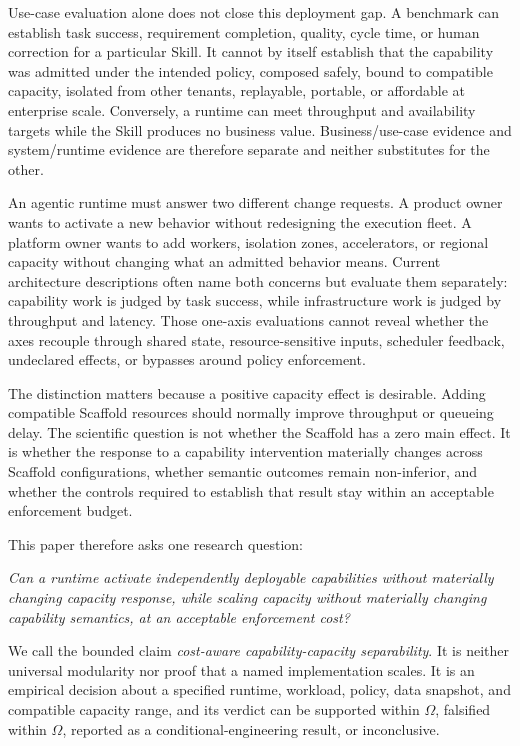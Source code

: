 Use-case evaluation alone does not close this deployment gap. A benchmark can establish task success, requirement completion, quality, cycle time, or human correction for a particular Skill. It cannot by itself establish that the capability was admitted under the intended policy, composed safely, bound to compatible capacity, isolated from other tenants, replayable, portable, or affordable at enterprise scale. Conversely, a runtime can meet throughput and availability targets while the Skill produces no business value. Business/use-case evidence and system/runtime evidence are therefore separate and neither substitutes for the other.

An agentic runtime must answer two different change requests. A product owner wants to activate a new behavior without redesigning the execution fleet. A platform owner wants to add workers, isolation zones, accelerators, or regional capacity without changing what an admitted behavior means. Current architecture descriptions often name both concerns but evaluate them separately: capability work is judged by task success, while infrastructure work is judged by throughput and latency. Those one-axis evaluations cannot reveal whether the axes recouple through shared state, resource-sensitive inputs, scheduler feedback, undeclared effects, or bypasses around policy enforcement.

The distinction matters because a positive capacity effect is desirable. Adding compatible Scaffold resources should normally improve throughput or queueing delay. The scientific question is not whether the Scaffold has a zero main effect. It is whether the response to a capability intervention materially changes across Scaffold configurations, whether semantic outcomes remain non-inferior, and whether the controls required to establish that result stay within an acceptable enforcement budget.

This paper therefore asks one research question:

\textit{Can a runtime activate independently deployable capabilities without materially changing capacity response, while scaling capacity without materially changing capability semantics, at an acceptable enforcement cost?}

We call the bounded claim \textit{cost-aware capability-capacity separability}. It is neither universal modularity nor proof that a named implementation scales. It is an empirical decision about a specified runtime, workload, policy, data snapshot, and compatible capacity range, and its verdict can be supported within $\Omega$, falsified within $\Omega$, reported as a conditional-engineering result, or inconclusive.

